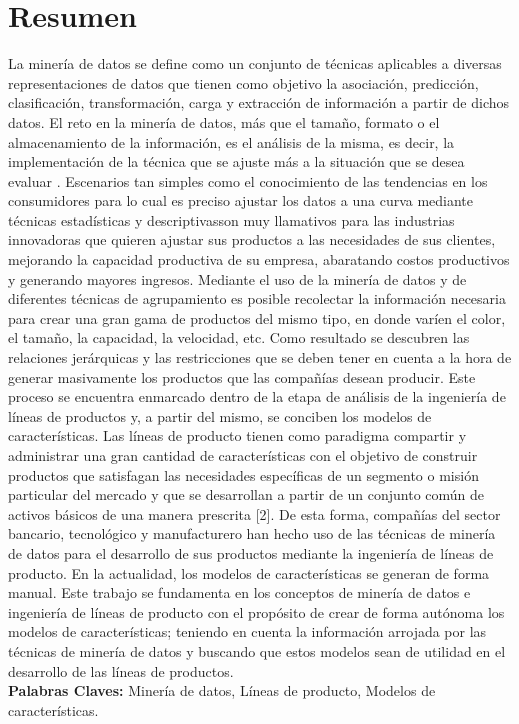 \chapter*{Resumen}

La minería de datos se define como un conjunto de técnicas aplicables a diversas representaciones de datos que tienen como objetivo la asociación, predicción, clasificación, transformación, carga y extracción de información a partir de dichos datos. El reto en la minería de datos, más que el tamaño, formato o el almacenamiento de la información, es el análisis de la misma, es decir, la implementación de la técnica que se ajuste más a la situación que se desea evaluar \cite{Izenman2006}. Escenarios tan simples como el conocimiento de las tendencias en los consumidores \textemdash	para lo cual es preciso ajustar los datos a una curva mediante técnicas estadísticas y descriptivas\textemdash son muy llamativos para las industrias innovadoras que quieren ajustar sus productos a las necesidades de sus clientes, mejorando la capacidad productiva de su empresa, abaratando costos productivos y generando mayores ingresos.
Mediante el uso de la minería de datos y de diferentes técnicas de agrupamiento es posible recolectar la información necesaria para crear una gran gama de productos del mismo tipo, en donde varíen el color, el tamaño, la capacidad, la velocidad, etc. Como resultado se descubren las relaciones jerárquicas y las restricciones que se deben tener en cuenta a la hora de generar masivamente los productos que las compañías desean producir. Este proceso se encuentra enmarcado dentro de la etapa de análisis de la ingeniería de líneas de productos y, a partir del mismo, se conciben los modelos de características. Las líneas de producto tienen como paradigma compartir y administrar una gran cantidad de características con el objetivo de construir productos que satisfagan las necesidades específicas de un segmento o misión particular del mercado y que se desarrollan a partir de un conjunto común de activos básicos de una manera prescrita [2]. De esta forma, compañías del sector bancario\cite{Koutanaei2015}, tecnológico \cite{Lin2013} y manufacturero \cite{Bae2011} han hecho uso de las técnicas de minería de datos para el desarrollo de sus productos mediante la ingeniería de líneas de producto. 
En la actualidad, los modelos de características se generan de forma manual. Este trabajo se fundamenta en los conceptos de minería de datos e ingeniería de líneas de producto con el propósito de crear de forma autónoma los modelos de características; teniendo en cuenta la información arrojada por las técnicas de minería de datos y buscando que estos modelos sean de utilidad en el desarrollo de las líneas de productos.
\\
\textbf{Palabras Claves:}
Minería de datos, Líneas de producto, Modelos de características.

